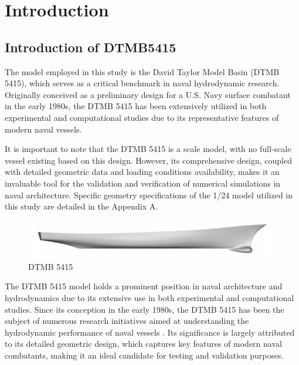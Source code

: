 \documentclass[12pt]{article} %
\begin{document}
\clearpage
\section{Introduction}

\subsection{Introduction of DTMB5415}

The model employed in this study is the David Taylor Model Basin (DTMB 5415), which serves as a 
critical benchmark in naval hydrodynamic research. Originally conceived as a preliminary design 
for a U.S. Navy surface combatant in the early 1980s, the DTMB 5415 has been extensively utilized 
in both experimental and computational studies due to its representative features of modern naval vessels.


It is important to note that the DTMB 5415 is a scale model, with no full-scale vessel existing 
based on this design. However, its comprehensive design, coupled with detailed geometric data and 
loading conditions availability, makes it an invaluable tool for the validation and verification of 
numerical simulations in naval architecture. Specific geometry specifications of the 1/24 model utilized
in this study are detailed in the Appendix A.

\begin{figure}[ht]
\centering
\includegraphics[width=1\textwidth]{DTMB.png}
\caption{DTMB 5415}
\end{figure}

The DTMB 5415 model holds a prominent position in naval architecture and hydrodynamics due to 
its extensive use in both experimental and computational studies. Since its conception in the 
early 1980s, the DTMB 5415 has been the subject of numerous research initiatives aimed at understanding 
the hydrodynamic performance of naval vessels \cite{elhadad2023}. Its significance is largely 
attributed to its detailed geometric design, which captures key features of modern naval combatants, 
making it an ideal candidate for testing and validation purposes.
\end{document}
